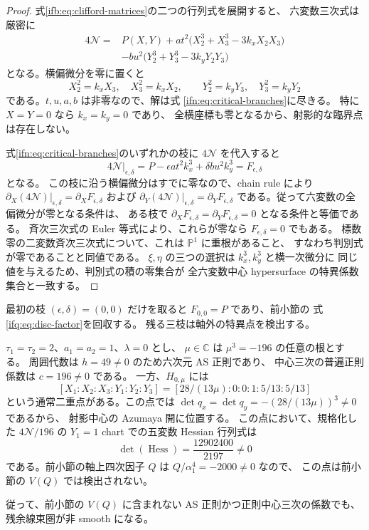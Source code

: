 \begin{proof}
式\eqref{ifb:eq:clifford-matrices}の二つの行列式を展開すると、
六変数三次式は厳密に
\begin{equation}\label{ifn:eq:complete-norm}
 \begin{split}
 4\mathcal N={}&P(X,Y)
 +at^2\bigl(X_2^3+X_3^3-3k_xX_2X_3\bigr)\\
 &-bu^2\bigl(Y_2^3+Y_3^3-3k_yY_2Y_3\bigr)
 \end{split}
\end{equation}
となる。横偏微分を零に置くと
\[
 X_2^2=k_xX_3,\quad X_3^2=k_xX_2,\qquad
 Y_2^2=k_yY_3,\quad Y_3^2=k_yY_2
\]
である。$t,u,a,b$ は非零なので、解は式
\eqref{ifn:eq:critical-branches}に尽きる。
特に $X=Y=0$ なら $k_x=k_y=0$ であり、
全横座標も零となるから、射影的な臨界点は存在しない。

式\eqref{ifn:eq:critical-branches}のいずれかの枝に
$4\mathcal N$ を代入すると
\[
 4\mathcal N|_{\epsilon,\delta}
 =P-\epsilon at^2k_x^3+\delta bu^2k_y^3
 =F_{\epsilon,\delta}
\]
となる。
この枝に沿う横偏微分はすでに零なので、chain rule により
$\partial_X(4\mathcal N)|_{\epsilon,\delta}
 =\partial_XF_{\epsilon,\delta}$ および
$\partial_Y(4\mathcal N)|_{\epsilon,\delta}
 =\partial_YF_{\epsilon,\delta}$
である。従って六変数の全偏微分が零となる条件は、
ある枝で $\partial_XF_{\epsilon,\delta}
 =\partial_YF_{\epsilon,\delta}=0$ となる条件と等価である。
斉次三次式の Euler 等式により、これらが零なら
$F_{\epsilon,\delta}=0$ でもある。
標数零の二変数斉次三次式について、これは
$\mathbb P^1$ に重根があること、
すなわち判別式が零であることと同値である。
$\xi,\eta$ の三つの選択は $k_x^3,k_y^3$ と横一次微分に
同じ値を与えるため、判別式の積の零集合が
全六変数中心 hypersurface の特異係数集合と一致する。
\end{proof}

最初の枝 $(\epsilon,\delta)=(0,0)$ だけを取ると
$F_{0,0}=P$ であり、前小節の
式\eqref{ifq:eq:disc-factor}を回収する。
残る三枝は軸外の特異点を検出する。

\begin{corollary}
\label{ifn:cor:off-axis-azumaya}
$\tau_1=\tau_2=2$、$a_1=a_2=1$、$\lambda=0$ とし、
$\mu\in\mathbb C$ は $\mu^3=-196$ の任意の根とする。
周囲代数は $h=49\ne0$ のため六次元 AS 正則であり、
中心三次の普遍正則係数は $c=196\ne0$ である。
一方、$H_{0,\mu}$ には
\begin{equation}\label{ifn:eq:off-axis-point}
 [X_1:X_2:X_3:Y_1:Y_2:Y_3]
 =
 [28/(13\mu):0:0:1:5/13:5/13]
\end{equation}
という通常二重点がある。この点では
$\det q_x=\det q_y=-(28/(13\mu))^3\ne0$ であるから、
射影中心の Azumaya 開に位置する。
この点において、規格化した $4\mathcal N/196$ の
$Y_1=1$ chart での五変数 Hessian 行列式は
\begin{equation}\label{ifn:eq:off-axis-hessian}
                 \det(\operatorname{Hess})=\frac{12902400}{2197}\ne0
\end{equation}
である。前小節の軸上四次因子 $Q$ は
$Q/\alpha_1^4=-2000\ne0$ なので、
この点は前小節の $V(Q)$ では検出されない。

従って、前小節の $V(Q)$ に含まれない
AS 正則かつ正則中心三次の係数でも、
残余線束圏が非 smooth になる。
\end{corollary}

